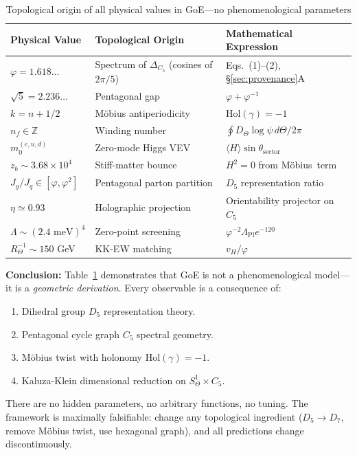 \documentclass[12pt]{article}
\newcommand{\Moebius}{M\"obius}
\newcommand{\SigMoeb}{\Sigma\text{--}\Moebius}
\begin{document}
\begin{table}[H]
\centering
\caption{Topological origin of all physical values in GoE—no phenomenological parameters}
\small
\begin{tabular}{lll}
\toprule
\textbf{Physical Value} & \textbf{Topological Origin} & \textbf{Mathematical Expression} \\
\midrule
$\varphi = 1.618\ldots$ & Spectrum of $\Delta_{C_5}$ (cosines of $2\pi/5$) & Eqs.~(1)--(2), \S\ref{sec:provenance}A \\
$\sqrt{5} = 2.236\ldots$ & Pentagonal gap & $\varphi + \varphi^{-1}$ \\
$k = n + 1/2$ & M\"obius antiperiodicity & $\text{Hol}(\gamma) = -1$ \\
$n_f \in \mathbb{Z}$ & Winding number & $\oint D_\Theta \log\psi \, d\Theta / 2\pi$ \\
$m_0^{(e,u,d)}$ & Zero-mode Higgs VEV & $\langle H \rangle \sin\theta_{\text{sector}}$ \\
$z_b \sim 3.68 \times 10^4$ & Stiff-matter bounce & $H^2 = 0$ from \SigMoeb\ term \\
$J_g/J_q \in [\varphi, \varphi^2]$ & Pentagonal parton partition & $D_5$ representation ratio \\
$\eta \simeq 0.93$ & Holographic projection & Orientability projector on $C_5$ \\
$\Lambda \sim (2.4 \text{ meV})^4$ & Zero-point screening & $\varphi^{-2} \Lambda_{\text{Pl}} e^{-120}$ \\
$R_\Theta^{-1} \sim 150$ GeV & KK-EW matching & $v_H / \varphi$ \\
\bottomrule
\end{tabular}
\label{tab:moebius_dictionary}
\end{table}

\textbf{Conclusion:} Table~\ref{tab:moebius_dictionary} demonstrates that GoE is not a phenomenological model—it is a \textit{geometric derivation}. Every observable is a consequence of:
\begin{enumerate}
\item Dihedral group $D_5$ representation theory.
\item Pentagonal cycle graph $C_5$ spectral geometry.
\item M\"obius twist with holonomy $\text{Hol}(\gamma) = -1$.
\item Kaluza-Klein dimensional reduction on $S^1_\Theta \times C_5$.
\end{enumerate}

There are no hidden parameters, no arbitrary functions, no tuning. The framework is maximally falsifiable: change any topological ingredient ($D_5 \to D_7$, remove M\"obius twist, use hexagonal graph), and all predictions change discontinuously.
\end{document}
